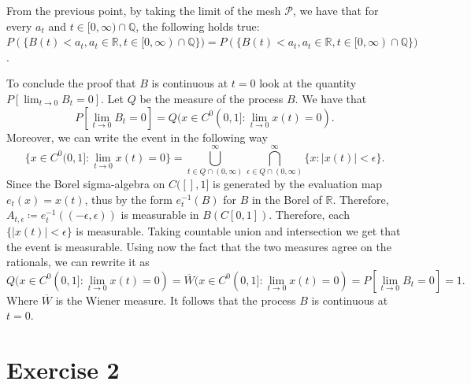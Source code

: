 \documentclass[a4paper,12pt]{article} %
\newtheorem{proposition}{Proposition}
\begin{document}
From the previous point, by taking the limit of the mesh \(\mathcal{P}\), we have that for every \(a_t\) and \(t \in  [0, \infty ) \cap \mathbb{Q}\), the following holds true: \(P(\{ B(t) <a_t , a_t \in  \mathbb{R},t \in  [0, \infty ) \cap \mathbb{Q} \} ) = P(\{ B(t) <a_t , a_t \in  \mathbb{R},t \in  [0, \infty ) \cap \mathbb{Q} \} )\).

    To conclude the proof that \(B\) is continuous at \(t=0\) look at the quantity \(P[\lim_{t \to 0} B_t=0] \).
    Let \(Q\) be the measure of the process \(B\). We have that
    \begin{equation}
        P[\lim_{t \to 0} B_t=0] = Q(x \in  C^0(0,1]: \lim_{t \to 0}x(t)=0 ).
    \end{equation}
    Moreover, we can write the event in the following way
    \begin{equation}
        \{ x \in  C^0(0,1]: \lim_{t \to 0}x(t)=0  \}  = \bigcup_{t\in Q \cap (0, \infty )}^{\infty} \bigcap_{\epsilon \in  Q \cap (0,\infty )}^{\infty} \{ x: |x(t)| < \epsilon \}.
    \end{equation}
    Since the Borel sigma-algebra on \(C([],1]\) is generated by the evaluation map \(e_t(x) = x(t)\), thus by the form \(e_t ^{-1} (B)\) for \(B\) in the Borel of \(\mathbb{R}\). Therefore, \(A_{t,\epsilon }\coloneqq e_t ^{-1} ((-\epsilon , \epsilon ))\) is measurable in \(B(C[0,1])\). Therefore, each \(\{ |x(t)|<\epsilon  \} \) is measurable. Taking countable union and intersection we get that the event is measurable.
Using now the fact that the two measures agree on the rationals, we can rewrite it as
\begin{equation}
    Q(x \in  C^0(0,1]: \lim_{t \to 0}x(t)=0 ) = \overline{W} (x \in  C^0(0,1]: \lim_{t \to 0}x(t)=0 )= P[\lim_{t \to 0} B_t=0]=1.
\end{equation}
Where \(\overline{W}\) is the Wiener measure. It follows that the process \(B\) is continuous at \(t=0\).



\section{Exercise 2}
\end{document}

